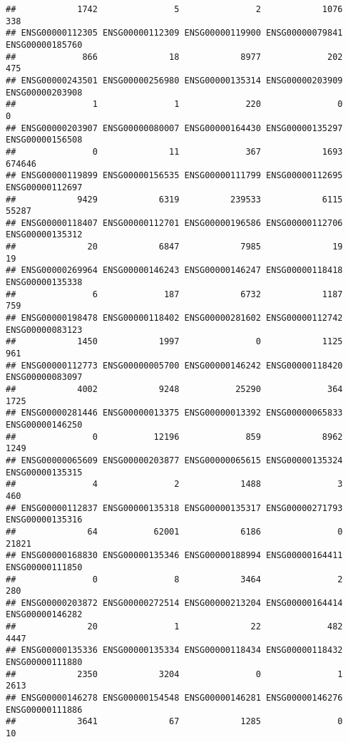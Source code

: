 \documentclass[
]{article}
\begin{document}
\begin{verbatim}
##            1742               5               2            1076             338 
## ENSG00000112305 ENSG00000112309 ENSG00000119900 ENSG00000079841 ENSG00000185760 
##             866              18            8977             202             475 
## ENSG00000243501 ENSG00000256980 ENSG00000135314 ENSG00000203909 ENSG00000203908 
##               1               1             220               0               0 
## ENSG00000203907 ENSG00000080007 ENSG00000164430 ENSG00000135297 ENSG00000156508 
##               0              11             367            1693          674646 
## ENSG00000119899 ENSG00000156535 ENSG00000111799 ENSG00000112695 ENSG00000112697 
##            9429            6319          239533            6115           55287 
## ENSG00000118407 ENSG00000112701 ENSG00000196586 ENSG00000112706 ENSG00000135312 
##              20            6847            7985              19              19 
## ENSG00000269964 ENSG00000146243 ENSG00000146247 ENSG00000118418 ENSG00000135338 
##               6             187            6732            1187             759 
## ENSG00000198478 ENSG00000118402 ENSG00000281602 ENSG00000112742 ENSG00000083123 
##            1450            1997               0            1125             961 
## ENSG00000112773 ENSG00000005700 ENSG00000146242 ENSG00000118420 ENSG00000083097 
##            4002            9248           25290             364            1725 
## ENSG00000281446 ENSG00000013375 ENSG00000013392 ENSG00000065833 ENSG00000146250 
##               0           12196             859            8962            1249 
## ENSG00000065609 ENSG00000203877 ENSG00000065615 ENSG00000135324 ENSG00000135315 
##               4               2            1488               3             460 
## ENSG00000112837 ENSG00000135318 ENSG00000135317 ENSG00000271793 ENSG00000135316 
##              64           62001            6186               0           21821 
## ENSG00000168830 ENSG00000135346 ENSG00000188994 ENSG00000164411 ENSG00000111850 
##               0               8            3464               2             280 
## ENSG00000203872 ENSG00000272514 ENSG00000213204 ENSG00000164414 ENSG00000146282 
##              20               1              22             482            4447 
## ENSG00000135336 ENSG00000135334 ENSG00000118434 ENSG00000118432 ENSG00000111880 
##            2350            3204               0               1            2613 
## ENSG00000146278 ENSG00000154548 ENSG00000146281 ENSG00000146276 ENSG00000111886 
##            3641              67            1285               0              10 

\end{verbatim}
\end{document}
